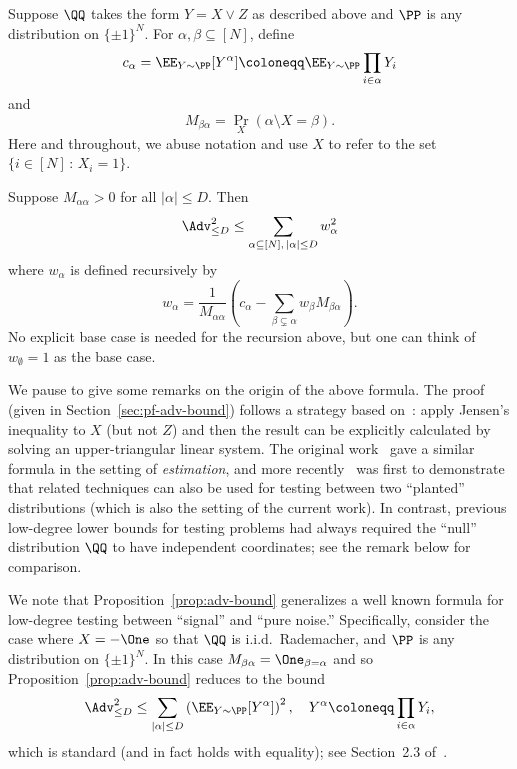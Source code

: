 \documentclass{article}
\begin{document}
\begin{proposition}\label{prop:adv-bound}
Suppose $\QQ$ takes the form $Y = X \vee Z$ as described above and $\PP$ is any distribution on $\{\pm 1\}^N$. For $\alpha,\beta \subseteq [N]$, define
\[ c_\alpha = \EE_{Y \sim \PP}[Y^\alpha] \coloneqq \EE_{Y \sim \PP} \prod_{i \in \alpha} Y_i \]
and
\[ M_{\beta\alpha} = \Pr_X(\alpha \setminus X = \beta). \]
Here and throughout, we abuse notation and use $X$ to refer to the set $\{i \in [N] \,:\, X_i = 1\}$.

Suppose $M_{\alpha\alpha} > 0$ for all $|\alpha| \le D$. Then
\begin{equation}\label{eq:adv-bound}
\Adv_{\le D}^2 \le \sum_{\alpha \subseteq [N],\, |\alpha| \le D} w_\alpha^2
\end{equation}
where $w_\alpha$ is defined recursively by
\[ w_\alpha = \frac{1}{M_{\alpha\alpha}}\left(c_\alpha - \sum_{\beta \subsetneq \alpha} w_\beta M_{\beta\alpha}\right). \]
No explicit base case is needed for the recursion above, but one can think of $w_\emptyset = 1$ as the base case.
\end{proposition}

We pause to give some remarks on the origin of the above formula. The proof (given in Section~\ref{sec:pf-adv-bound}) follows a strategy based on~\cite{SW-recovery}: apply Jensen's inequality to $X$ (but not $Z$) and then the result can be explicitly calculated by solving an upper-triangular linear system. The original work~\cite{SW-recovery} gave a similar formula in the setting of \emph{estimation}, and more recently~\cite{planted-planted} was first to demonstrate that related techniques can also be used for testing between two ``planted'' distributions (which is also the setting of the current work). In contrast, previous low-degree lower bounds for testing problems had always required the ``null'' distribution $\QQ$ to have independent coordinates; see the remark below for comparison.

\begin{remark}\label{rem:gen}
We note that Proposition~\ref{prop:adv-bound} generalizes a well known formula for low-degree testing between ``signal'' and ``pure noise.'' Specifically, consider the case where $X = -\One$ so that $\QQ$ is i.i.d.\ Rademacher, and $\PP$ is any distribution on $\{\pm 1\}^N$. In this case $M_{\beta\alpha} = \One_{\beta=\alpha}$ and so Proposition~\ref{prop:adv-bound} reduces to the bound
\[ \Adv_{\le D}^2 \le \sum_{|\alpha| \le D} \left(\EE_{Y \sim \PP}[Y^\alpha]\right)^2, \quad Y^\alpha \coloneqq \prod_{i \in \alpha} Y_i,\]
which is standard (and in fact holds with equality); see Section~2.3 of~\cite{hopkins-thesis}.
\end{remark}
\end{document}
